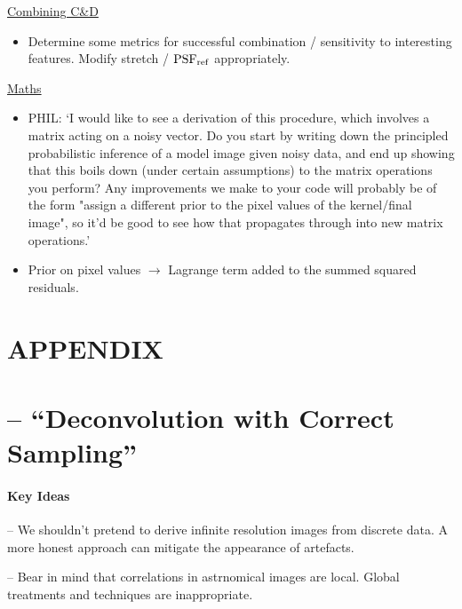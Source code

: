 \documentclass[letterpaper, 11pt]{article}
\def\psfref{\ensuremath{{\rm PSF_{ref}}}\xspace}
\def\ra{\ensuremath{\rightarrow}\xspace}
\begin{document}
\underline{Combining C\&D}
\begin{itemize}
	\item Determine some metrics for successful combination / sensitivity to interesting features. Modify stretch / \psfref appropriately.
\end{itemize}

\underline{Maths}
\begin{itemize}
	\item PHIL: `I would like to see a derivation of this procedure, which involves a matrix acting on a noisy vector. Do you start by writing down the principled probabilistic inference of a model image given noisy data, and end up showing that this boils down (under certain assumptions) to the matrix operations you perform? Any improvements we make to your code will probably be of the form "assign a different prior to the pixel values of the kernel/final image", so it'd be good to see how that propagates through into new matrix operations.'

	\item Prior on pixel values \ra Lagrange term added to the summed squared residuals.
\end{itemize}




\newpage
\appendix
{}
\section*{APPENDIX}

\section{\citet{MCS98} -- ``Deconvolution with Correct Sampling''}
\label{sec:MCS98notes}

\paragraph{Key Ideas}

-- We shouldn't pretend to derive infinite resolution images from discrete data. A more honest approach can mitigate the appearance of 
artefacts.

-- Bear in mind that correlations in astrnomical images are local. Global treatments and techniques are inappropriate.
\end{document}
